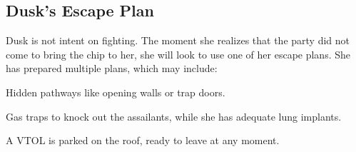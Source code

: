 \subsection*{Dusk's Escape Plan}
Dusk is not intent on fighting.
The moment she realizes that the party did not come to bring the chip to her,
	she will look to use one of her escape plans.
She has prepared multiple plans, which may include:
\begin{sitemize}
	\item Hidden pathways like opening walls or trap doors.
	\item Gas traps to knock out the assailants,
		while she has adequate lung implants.
	\item A VTOL is parked on the roof, ready to leave at any moment.
\end{sitemize}
